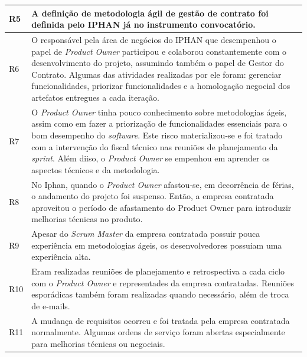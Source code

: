 \begin{longtable}{|p{2cm}|p{13cm}|}
R5                                                                & A definição de metodologia ágil de gestão de contrato foi definida pelo IPHAN já no instrumento convocatório.            \\ \hline
R6                                                                & O responsável pela área de negócios do IPHAN que desempenhou o papel de \textit{Product Owner} participou e colaborou constantemente com o desenvolvimento do projeto, assumindo também o papel de Gestor do Contrato. Algumas das atividades realizadas por ele foram: gerenciar funcionalidades, priorizar funcionalidades e a homologação negocial dos artefatos entregues a cada iteração. \\ \hline
R7                                                                & O \textit{Product Owner} tinha pouco conhecimento sobre metodologias ágeis, assim como em fazer a priorização de funcionalidades essenciais para o bom desempenho do \textit{software}. Este risco materializou-se e foi tratado com a intervenção do fiscal técnico nas reuniões de planejamento da \textit{sprint}. Além diiso, o \textit{Product Owner} se empenhou em aprender os aspectos técnicos e da metodologia.               \\ \hline
R8                                                                & No Iphan, quando o \textit{Product Owner} afastou-se, em decorrência de férias, o andamento do projeto foi suspenso. Então, a empresa contratada aproveitou o período de afastamento do Product Owner para introduzir melhorias técnicas no produto.       \\ \hline
R9                                                                & Apesar do \textit{Scrum Master} da empresa contratada possuir pouca experiência em metodologias ágeis, os desenvolvedores possuiam uma experiência alta.              \\ \hline
R10                                                               &  Eram realizadas reuniões de planejamento e retrospectiva a cada ciclo com o \textit{Product Owner} e representades da empresa contratadas. Reuniões esporádicas também foram realizadas quando necessário, além de troca de e-mails.               \\ \hline
R11                                                               & A mudança de requisitos ocorreu e foi tratada pela empresa contratada normalmente. Algumas ordens de serviço foram abertas especialmente para melhorias técnicas ou negociais.            \\ \hline

\end{longtable}
